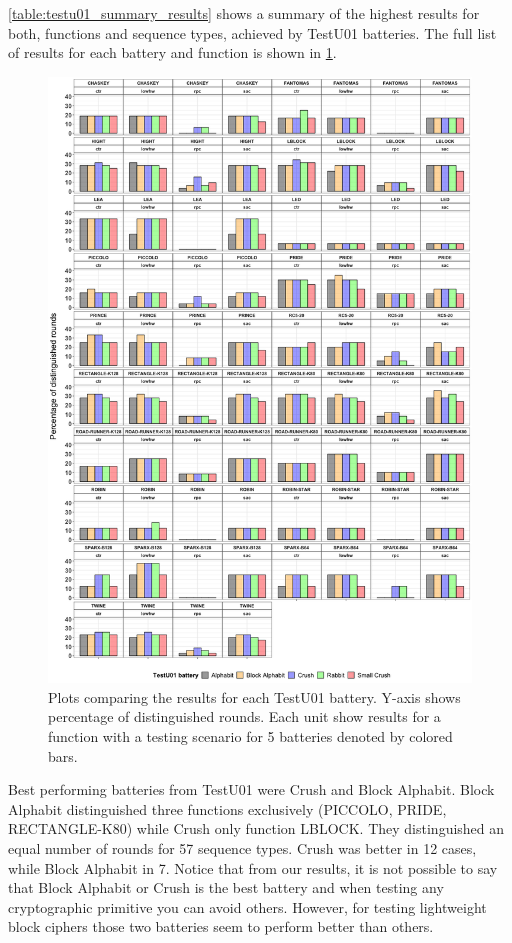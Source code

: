 \documentclass[
    digital,    %
    oneside,    %
    color,
    11pt,
    nocover,
    notable,
    nolof,
    nolot,
    final
]{fithesis3}
\renewcommand\_{\textunderscore\allowbreak}
\begin{document}
\cref{table:testu01_summary_results} shows a summary of the highest results for both, functions and sequence types, achieved by TestU01 batteries. The full list of results for each battery and function is shown in \cref{fig:testu01_all}.

\begin{figure}[htp]
	\centering
	\includegraphics[width=\textwidth]{./images/pictures/testu01_comparison.png}
	\caption{Plots comparing the results for each TestU01 battery. Y-axis shows percentage of distinguished rounds. Each unit show results for a function with a testing scenario for 5 batteries denoted by colored bars. }
	\label{fig:testu01_all}
\end{figure}

Best performing batteries from TestU01 were Crush and Block Alphabit. Block Alphabit distinguished three functions exclusively (PICCOLO, PRIDE, RECTANGLE-K80) while Crush only function LBLOCK. They distinguished an equal number of rounds for 57 sequence types. Crush was better in 12 cases, while Block Alphabit in 7. Notice that from our results, it is not possible to say that Block Alphabit or Crush is the best battery and when testing any cryptographic primitive you can avoid others. However, for testing lightweight block ciphers those two batteries seem to perform better than others.
\end{document}
